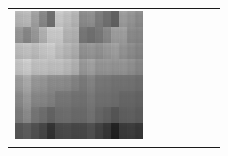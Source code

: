 \documentclass[11pt,a4paper,openright,oneside]{book}
\numberwithin{equation}{section}
\begin{document}
{\begin{figure}[h]
\begin{adjustwidth}{-3cm}{-3cm}
\begin{tabular}{>{\centering\arraybackslash}m{1.5cm} m{2.5cm} m{2.5cm} m{2.5cm} m{2.5cm} m{2.5cm}}
        \includegraphics[width=\linewidth]{media/tnale/AAAfruits-comp5-ale-0.25.png} \\


\end{tabular}
\end{adjustwidth}
\end{figure}}
\end{document}
